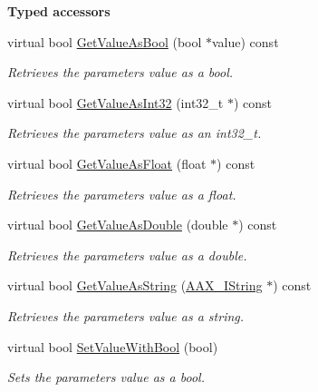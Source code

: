 \begin{Indent}{\bf Typed accessors}\par
\begin{DoxyCompactItemize}
\item 
virtual bool \hyperlink{a00040_a03d0e55359ccaee389cd4a84f198987a}{Get\+Value\+As\+Bool} (bool $\ast$value) const 
\begin{DoxyCompactList}\small\item\em Retrieves the parameter\textquotesingle{}s value as a bool. \end{DoxyCompactList}\item 
virtual bool \hyperlink{a00040_abfd1cff2442ee80cd778d5a0aa87a1c2}{Get\+Value\+As\+Int32} (int32\+\_\+t $\ast$) const 
\begin{DoxyCompactList}\small\item\em Retrieves the parameter\textquotesingle{}s value as an int32\+\_\+t. \end{DoxyCompactList}\item 
virtual bool \hyperlink{a00040_ab1c9bba2d5a6dc9838220b43c0bbdd72}{Get\+Value\+As\+Float} (float $\ast$) const 
\begin{DoxyCompactList}\small\item\em Retrieves the parameter\textquotesingle{}s value as a float. \end{DoxyCompactList}\item 
virtual bool \hyperlink{a00040_abc09795d0fb77c3c5ed97aef6128121e}{Get\+Value\+As\+Double} (double $\ast$) const 
\begin{DoxyCompactList}\small\item\em Retrieves the parameter\textquotesingle{}s value as a double. \end{DoxyCompactList}\item 
virtual bool \hyperlink{a00040_ac7f5e9aefdbdcaa333464a7144c162ca}{Get\+Value\+As\+String} (\hyperlink{a00113}{A\+A\+X\+\_\+\+I\+String} $\ast$) const 
\begin{DoxyCompactList}\small\item\em Retrieves the parameter\textquotesingle{}s value as a string. \end{DoxyCompactList}\item 
virtual bool \hyperlink{a00040_af0ecfc0a09adfd0c91b98e470269069e}{Set\+Value\+With\+Bool} (bool)
\begin{DoxyCompactList}\small\item\em Sets the parameter\textquotesingle{}s value as a bool. \end{DoxyCompactList}\item 

\end{DoxyCompactItemize}
\end{Indent}
